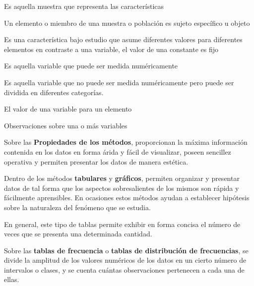 \begin{definition}
    Es aquella muestra que representa las características
\end{definition}

\begin{definition}
    Un elemento o miembro de una muestra o población es sujeto específico u objeto
\end{definition}

\begin{definition}[Variable]
    Es una característica bajo estudio que asume diferentes valores para diferentes elementos en contraste a una variable, el valor de una constante es fijo
\end{definition}

\begin{definition}
    Es aquella variable que puede ser medida numéricamente
\end{definition}

\begin{definition}
    Es aquella variable que no puede ser medida numéricamente pero puede ser dividida en diferentes categorías.
\end{definition}

\begin{definition}
    El valor de una variable para un elemento
\end{definition}

\begin{definition}
    Observaciones sobre una o más variables
\end{definition}

Sobre las \textbf{Propiedades de los métodos}, proporcionan la máxima información contenida en los datos en forma árida y fácil de visualizar, poseen sencillez operativa y permiten presentar los datos de manera estética.

Dentro de los métodos \textbf{tabulares} y \textbf{gráficos}, permiten organizar y presentar datos de tal forma que los aspectos sobresalientes de los mismos son rápida y fácilmente aprensibles. En ocasiones estos métodos ayudan a establecer hipótesis sobre la naturaleza del fenómeno que se estudia.

En general, este tipo de tablas permite exhibir en forma concisa el número de veces que se presenta una determinada cantidad.

Sobre las \textbf{tablas de frecuencia} o \textbf{tablas de distribución de frecuencias}, se divide la amplitud de los valores numéricos de los datos en un cierto número de intervalos o clases, y se cuenta cuántas observaciones pertenecen a cada una de ellas.

